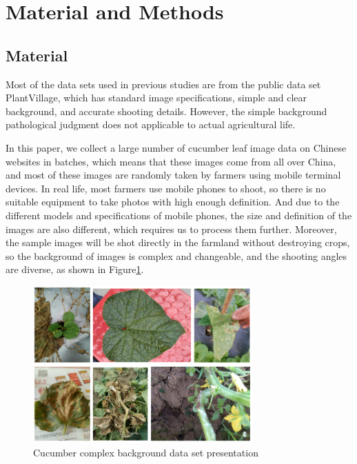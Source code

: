 \documentclass[a4paper,fleqn]{cas-sc}
\begin{document}
\section{Material and Methods}

\subsection{Material}
Most of the data sets used in previous studies are from the public data set PlantVillage, which has standard image specifications, simple and clear background, and accurate shooting details. However, the simple background pathological judgment does not applicable to actual agricultural life.

In this paper, we collect a large number of cucumber leaf image data on Chinese websites in batches, which means that these images come from all over China, and most of these images are randomly taken by farmers using mobile terminal devices. In real life, most farmers use mobile phones to shoot, so there is no suitable equipment to take photos with high enough definition. And due to the different models and specifications of mobile phones, the size and definition of the images are also different, which requires us to process them further. Moreover, the sample images will be shot directly in the farmland without destroying crops, so the background of images is complex and changeable, and the shooting angles are diverse, as shown in Figure\ref{fig:f1}.
\begin{figure}
\centering
\includegraphics[width=0.75\textwidth]{figs_rev1/f1.png}
\caption{Cucumber complex background data set presentation}
\label{fig:f1}
\end{figure}
\end{document}
